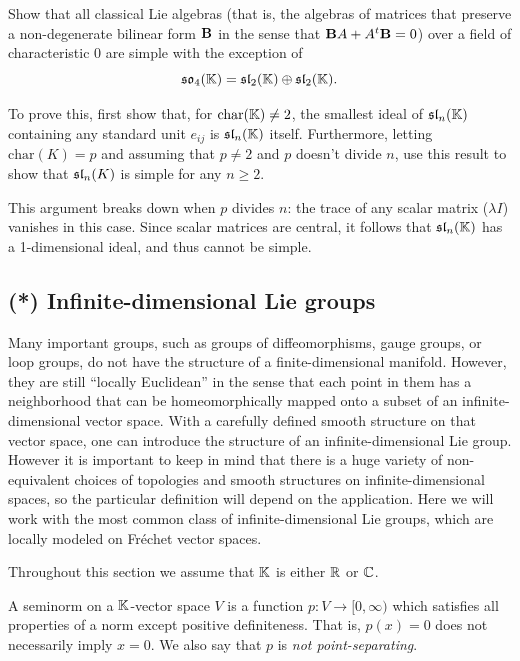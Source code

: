 \begin{xca}
    Show that all classical Lie algebras (that is, the algebras of matrices that preserve a non-degenerate bilinear form $\bf{B}$ in the sense that $\bf{B}A+A^t\bf{B}=0$) over a field of characteristic 0 are simple with the exception of
    \[\frakso_4(\bbK)=\fraksl_2(\bbK)\oplus\fraksl_2(\bbK).\]

    To prove this, first show that, for $\mathrm{char}(\bbK)\neq 2$, the smallest ideal of $\fraksl_n(\bbK)$ containing any standard unit $e_{ij}$ is $\fraksl_n(\bbK)$ itself. Furthermore, letting $\mathrm{char}(K)=p$ and assuming that $p\neq 2$ and $p$ doesn't divide $n$, use this result to show that $\fraksl_n(K)$ is simple for any $n\geq 2$. 

    This argument breaks down when $p$ divides $n$: the trace of any scalar matrix ($\lambda I$) vanishes in this case. Since scalar matrices are central, it follows that $\fraksl_n(\bbK)$ has a 1-dimensional ideal, and thus cannot be simple.
\end{xca}






\subsection{(*) Infinite-dimensional Lie groups}\label{sec: inf-dim groups}


Many important groups, such as groups of diffeomorphisms, gauge groups, or loop groups, do not have the structure of a finite-dimensional manifold. However, they are still ``locally Euclidean'' in the sense that each point in them has a neighborhood that can be homeomorphically mapped onto a subset of an infinite-dimensional vector space. With a carefully defined smooth structure on that vector space, one can introduce the structure of an infinite-dimensional Lie group. However it is important to keep in mind that there is a huge variety of non-equivalent choices of topologies and smooth structures on infinite-dimensional spaces, so the particular definition will depend on the application. Here we will work with the most common class of infinite-dimensional Lie groups, which are locally modeled on Fr\'echet vector spaces.

Throughout this section we assume that $\bbK$ is either $\bbR$ or $\bbC$.

\begin{defn}[Seminorm]
    A seminorm on a $\bbK$-vector space $V$ is a function $p:V\to [0,\infty)$ which satisfies all properties of a norm except positive definiteness. That is, $p(x)=0$ does not necessarily imply $x=0$. We also say that $p$ is \emph{not point-separating}.
\end{defn}

